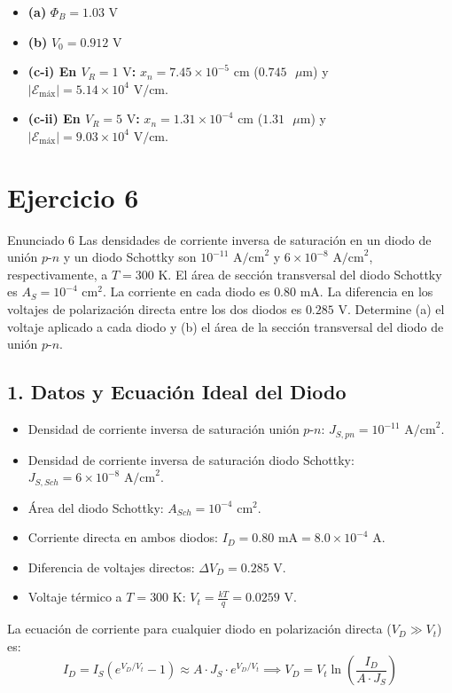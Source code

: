 \documentclass[11pt,a4paper]{article}
\begin{document}
\begin{respuestabox}
\begin{itemize}
    \item \textbf{(a)} $\Phi_B = 1.03\text{ V}$
    \item \textbf{(b)} $V_0 = 0.912\text{ V}$
    \item \textbf{(c-i) En $V_R = 1\text{ V}$:} $x_n = 7.45 \times 10^{-5}\text{ cm}$ ($0.745\text{ }\mu\text{m}$) y $|\mathcal{E}_{\text{máx}}| = 5.14 \times 10^4\text{ V/cm}$.
    \item \textbf{(c-ii) En $V_R = 5\text{ V}$:} $x_n = 1.31 \times 10^{-4}\text{ cm}$ ($1.31\text{ }\mu\text{m}$) y $|\mathcal{E}_{\text{máx}}| = 9.03 \times 10^4\text{ V/cm}$.
\end{itemize}
\end{respuestabox}

\newpage

\section*{Ejercicio 6}
\begin{ejerciciobox}{Enunciado 6}
Las densidades de corriente inversa de saturación en un diodo de unión $p$-$n$ y un diodo Schottky son $10^{-11}\text{ A/cm}^2$ y $6 \times 10^{-8}\text{ A/cm}^2$, respectivamente, a $T = 300\text{ K}$. El área de sección transversal del diodo Schottky es $A_S = 10^{-4}\text{ cm}^2$. La corriente en cada diodo es $0.80\text{ mA}$. La diferencia en los voltajes de polarización directa entre los dos diodos es $0.285\text{ V}$. Determine (a) el voltaje aplicado a cada diodo y (b) el área de la sección transversal del diodo de unión $p$-$n$.
\end{ejerciciobox}

\subsection*{1. Datos y Ecuación Ideal del Diodo}
\begin{itemize}
    \item Densidad de corriente inversa de saturación unión $p$-$n$: $J_{S,pn} = 10^{-11}\text{ A/cm}^2$.
    \item Densidad de corriente inversa de saturación diodo Schottky: $J_{S,Sch} = 6 \times 10^{-8}\text{ A/cm}^2$.
    \item Área del diodo Schottky: $A_{Sch} = 10^{-4}\text{ cm}^2$.
    \item Corriente directa en ambos diodos: $I_D = 0.80\text{ mA} = 8.0 \times 10^{-4}\text{ A}$.
    \item Diferencia de voltajes directos: $\Delta V_D = 0.285\text{ V}$.
    \item Voltaje térmico a $T = 300\text{ K}$: $V_t = \frac{kT}{q} = 0.0259\text{ V}$.
\end{itemize}
La ecuación de corriente para cualquier diodo en polarización directa ($V_D \gg V_t$) es:
\[
I_D = I_S \left( e^{V_D/V_t} - 1 \right) \approx A \cdot J_S \cdot e^{V_D/V_t} \implies V_D = V_t \ln\left(\frac{I_D}{A \cdot J_S}\right)
\]
\end{document}

